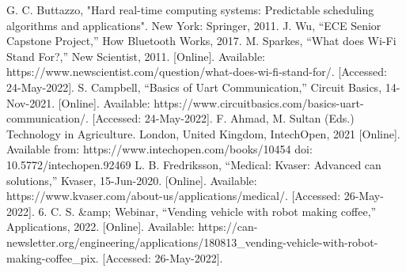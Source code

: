 \documentclass[conference]{IEEEtran}
\begin{document}
\begin{thebibliography}{00}
 G. C. Buttazzo, "Hard real-time computing systems: Predictable scheduling algorithms and applications". New York: Springer, 2011. 
  J. Wu, “ECE Senior Capstone Project,” How Bluetooth Works, 2017. 
  M. Sparkes, “What does Wi-Fi Stand For?,” New Scientist, 2011. [Online]. Available: https://www.newscientist.com/question/what-does-wi-fi-stand-for/. [Accessed: 24-May-2022]. 
  S. Campbell, “Basics of Uart Communication,” Circuit Basics, 14-Nov-2021. [Online]. Available: https://www.circuitbasics.com/basics-uart-communication/. [Accessed: 24-May-2022]. 
  F. Ahmad, M. Sultan (Eds.) Technology in Agriculture. London, United Kingdom, IntechOpen, 2021 [Online]. Available from: https://www.intechopen.com/books/10454 doi: 10.5772/intechopen.92469
 L. B. Fredriksson, “Medical: Kvaser: Advanced can solutions,” Kvaser, 15-Jun-2020. [Online]. Available: https://www.kvaser.com/about-us/applications/medical/. [Accessed: 26-May-2022].
 6.	C. S. &amp; Webinar, “Vending vehicle with robot making coffee,” Applications, 2022. [Online]. Available: https://can-newsletter.org/engineering/applications/180813_vending-vehicle-with-robot-making-coffee_pix. [Accessed: 26-May-2022].

\end{thebibliography}
\end{document}
